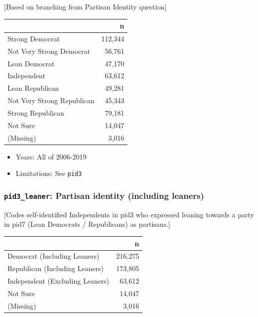 \documentclass[10pt,article,oneside]{memoir}
\theoremstyle{definition}
\begin{document}
{[}Based on branching from Partisan Identity question{]}

\begin{table}[H]
\centering
\begin{tabular}{lr}
\toprule
 & n\\
\midrule
Strong Democrat & 112,344\\
Not Very Strong Democrat & 56,761\\
Lean Democrat & 47,170\\
Independent & 63,612\\
Lean Republican & 49,281\\
Not Very Strong Republican & 45,343\\
Strong Republican & 79,181\\
Not Sure & 14,047\\
(Missing) & 3,016\\
\bottomrule
\end{tabular}
\end{table}

\begin{itemize}
\tightlist
\item
  Years: All of 2006-2019
\item
  Limitations: See \texttt{pid3}
\end{itemize}

\hypertarget{pid3_leaner-partisan-identity-including-leaners}{%
\subsubsection{\texorpdfstring{\texttt{pid3\_leaner}: Partisan identity
(including
leaners)}{pid3\_leaner: Partisan identity (including leaners)}}\label{pid3_leaner-partisan-identity-including-leaners}}

{[}Codes self-identified Independents in pid3 who expressed leaning
towards a party in pid7 (Lean Democrats / Republicans) as partisans.{]}

\begin{table}[H]
\centering
\begin{tabular}{lr}
\toprule
 & n\\
\midrule
Democrat (Including Leaners) & 216,275\\
Republican (Including Leaners) & 173,805\\
Independent (Excluding Leaners) & 63,612\\
Not Sure & 14,047\\
(Missing) & 3,016\\
\bottomrule
\end{tabular}
\end{table}
\end{document}

